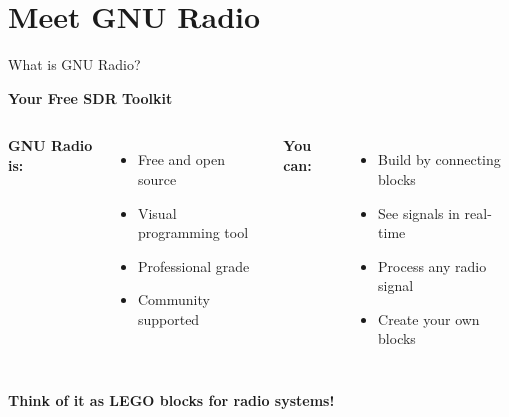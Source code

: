 \documentclass[aspectratio=169,12pt]{beamer}
\begin{document}
\section{Meet GNU Radio}

\begin{frame}{What is GNU Radio?}
\begin{center}
\Large\textbf{Your Free SDR Toolkit}
\end{center}
\vspace{1em}

\begin{columns}
\textbf{GNU Radio is:}
\begin{itemize}
    \item Free and open source
    \item Visual programming tool
    \item Professional grade
    \item Community supported
\end{itemize}

\textbf{You can:}
\begin{itemize}
    \item Build by connecting blocks
    \item See signals in real-time
    \item Process any radio signal
    \item Create your own blocks
\end{itemize}
\end{columns}

\vspace{1em}
\begin{center}
\colorbox{radioblue!20}{\parbox{0.8\textwidth}{\centering
\textbf{Think of it as LEGO blocks for radio systems!}}}
\end{center}
\end{frame}
\end{document}
